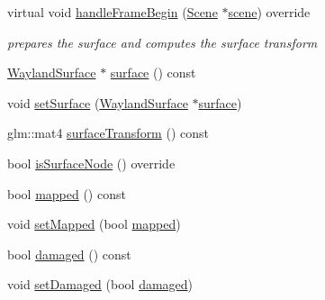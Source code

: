 \begin{DoxyCompactItemize}
virtual void \hyperlink{classmotorcar_1_1WaylandSurfaceNode_a7005bcd9c0944cec3b558344602c783e}{handle\-Frame\-Begin} (\hyperlink{classmotorcar_1_1Scene}{Scene} $\ast$\hyperlink{classmotorcar_1_1SceneGraphNode_aa14e637ed4ae98f77e28941a4b5cfdd8}{scene}) override
\begin{DoxyCompactList}\small\item\em prepares the surface and computes the surface transform \end{DoxyCompactList}\item 
\hyperlink{classmotorcar_1_1WaylandSurface}{Wayland\-Surface} $\ast$ \hyperlink{classmotorcar_1_1WaylandSurfaceNode_a2f888be4621ed73d815ce006246f50ca}{surface} () const 
\item 
void \hyperlink{classmotorcar_1_1WaylandSurfaceNode_ae073a9e9f05bd5d62f09d24f9a86a31a}{set\-Surface} (\hyperlink{classmotorcar_1_1WaylandSurface}{Wayland\-Surface} $\ast$\hyperlink{simple-egl_8cpp_a0720952aa1caded45b5bcdce589663a9}{surface})
\item 
glm\-::mat4 \hyperlink{classmotorcar_1_1WaylandSurfaceNode_a3910d8ccc764aed402074f21c25a89e8}{surface\-Transform} () const 
\item 
bool \hyperlink{classmotorcar_1_1WaylandSurfaceNode_a35b01820957837d5b3a4625cca82776d}{is\-Surface\-Node} () override
\item 
bool \hyperlink{classmotorcar_1_1WaylandSurfaceNode_a0beab8d65060cff08f645b070a2b1dae}{mapped} () const 
\item 
void \hyperlink{classmotorcar_1_1WaylandSurfaceNode_ac8fa09a02baab4d465a482b5ee361806}{set\-Mapped} (bool \hyperlink{classmotorcar_1_1WaylandSurfaceNode_a0beab8d65060cff08f645b070a2b1dae}{mapped})
\item 
bool \hyperlink{classmotorcar_1_1WaylandSurfaceNode_a49d09e0f0cd3b47c6d67765961da2bf3}{damaged} () const 
\item 
void \hyperlink{classmotorcar_1_1WaylandSurfaceNode_a7acc51a9df01468554691b5e9b681974}{set\-Damaged} (bool \hyperlink{classmotorcar_1_1WaylandSurfaceNode_a49d09e0f0cd3b47c6d67765961da2bf3}{damaged})
\end{DoxyCompactItemize}
